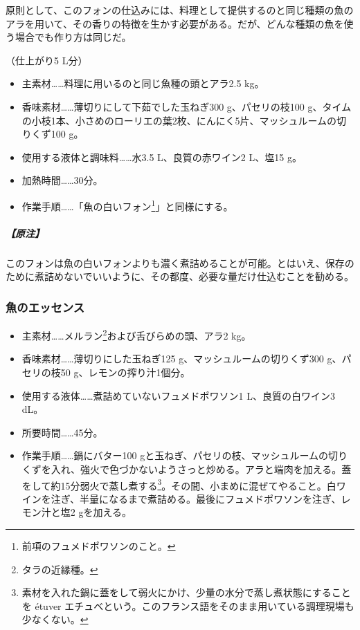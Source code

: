 \begin{recette}
原則として、このフォンの仕込みには、料理として提供するのと同じ種類の魚のアラを用いて、その香りの特徴を生かす必要がある。だが、どんな種類の魚を使う場合でも作り方は同じだ。

（仕上がり5 L分）

\begin{itemize}
\item
  主素材\ldots{}\ldots{}料理に用いるのと同じ魚種の頭とアラ2.5 kg。
\item
  香味素材\ldots{}\ldots{}薄切りにして下茹でした玉ねぎ300
  g、パセリの枝100
  g、タイムの小枝1本、小さめのローリエの葉2枚、にんにく5片、マッシュルームの切りくず100
  g。
\item
  使用する液体と調味料\ldots{}\ldots{}水3.5 L、良質の赤ワイン2 L、塩15
  g。
\item
  加熱時間\ldots{}\ldots{}30分。
\item
  作業手順\ldots{}\ldots{}「魚の白いフォン\footnote{前項のフュメドポワソンのこと。}」と同様にする。
\end{itemize}

\hypertarget{nota-fonds-de-poisson-au-vin-rouge}{%
\subparagraph{【原注】}\label{nota-fonds-de-poisson-au-vin-rouge}}

このフォンは魚の白いフォンよりも濃く煮詰めることが可能。とはいえ、保存のために煮詰めないでいいように、その都度、必要な量だけ仕込むことを勧める。

\hypertarget{essence-de-poisson}{%
\subsubsection{魚のエッセンス}\label{essence-de-poisson}}



\begin{itemize}
\item
  主素材\ldots{}\ldots{}メルラン\footnote{タラの近縁種。}および舌びらめの頭、アラ2
  kg。
\item
  香味素材\ldots{}\ldots{}薄切りにした玉ねぎ125
  g、マッシュルームの切りくず300 g、パセリの枝50
  g、レモンの搾り汁1個分。
\item
  使用する液体\ldots{}\ldots{}煮詰めていないフュメドポワソン1\undemi{}
  L、良質の白ワイン3 dL。
\item
  所要時間\ldots{}\ldots{}45分。
\item
  作業手順\ldots{}\ldots{}鍋にバター100
  gと玉ねぎ、パセリの枝、マッシュルームの切りくずを入れ、強火で色づかないようさっと炒める。アラと端肉を加える。蓋をして約15分弱火で蒸し煮する\footnote{素材を入れた鍋に蓋をして弱火にかけ、少量の水分で蒸し煮状態にすることを
    étuver
    エチュベという。このフランス語をそのまま用いている調理現場も少なくない。}。その間、小まめに混ぜてやること。白ワインを注ぎ、半量になるまで煮詰める。最後にフュメドポワソンを注ぎ、レモン汁と塩2
  gを加える。
\end{itemize}


\end{recette}
